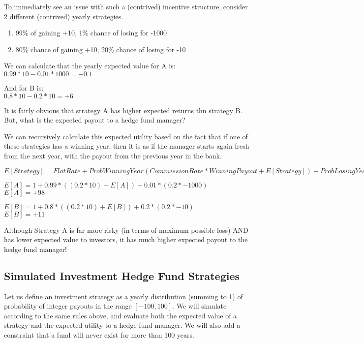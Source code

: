 \documentclass[11pt]{article}
\providecommand{\tightlist}{%
      \setlength{\itemsep}{0pt}\setlength{\parskip}{0pt}}
\begin{document}
    To immediately see an issue with such a (contrived) incentive structure,
consider 2 different (contrived) yearly strategies.

\begin{enumerate}
\def\labelenumi{\Alph{enumi})}
\tightlist
\item
  99\% of gaining +10, 1\% chance of losing for -1000\\
\item
  80\% chance of gaining +10, 20\% chance of losing for -10
\end{enumerate}

    We can calculate that the yearly expected value for A is:\\
\(0.99 * 10 - 0.01 * 1000 = -0.1\)

And for B is:\\
\(0.8 * 10 - 0.2 * 10 = +6\)

It is fairly obvious that strategy A has higher expected returns thn
strategy B. But, what is the expected payout to a hedge fund manager?

    We can recursively calculate this expected utility based on the fact
that if one of these strategies has a winning year, then it is as if the
manager starts again fresh from the next year, with the payout from the
previous year in the bank.

    \(E[Strategy] = Flat Rate + Prob Winning Year (Commission Rate * Winning Payout + E[Strategy]) + Prob Losing Year * (Commision Rate * Losing Payout)\)

\(E[A] = 1 + 0.99 * ((0.2 * 10) + E[A]) + 0.01 * (0.2 * -1000)\)\\
\(E[A] = +98\)

\(E[B] = 1 + 0.8 * ((0.2 * 10) + E[B]) + 0.2 * (0.2 * -10)\)\\
\(E[B] = +11\)

    Although Strategy A is far more risky (in terms of maximum possible
loss) AND has lower expected value to investors, it has much higher
expected payout to the hedge fund manager!

    \subsection{Simulated Investment Hedge Fund
Strategies}\label{simulated-investment-hedge-fund-strategies}

    Let us define an investment strategy as a yearly distribution (summing
to 1) of probability of integer payouts in the range \([-100, 100]\). We
will simulate according to the same rules above, and evaluate both the
expected value of a strategy and the expected utility to a hedge fund
manager. We will also add a constraint that a fund will never exist for
more than 100 years.
\end{document}
